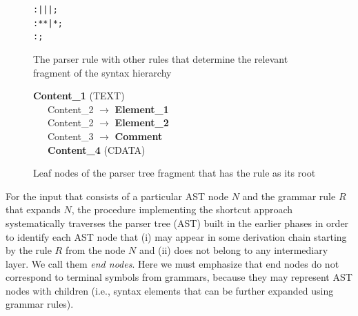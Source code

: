 \begin{figure}[ht]
\centering
\begin{framed}
\begin{alltt}
\small
   :  |  |  |  ;
   : \antlrliteral{<}  * \antlrliteral{>} * \antlrliteral{</}  \antlrliteral{>} | \antlrliteral{<}  * \antlrliteral{/>} ;
   : \antlrliteral{<!--}  \antlrliteral{-->} ;
\end{alltt}
\end{framed}
\caption{The parser rule  with other rules that determine the relevant fragment of the syntax hierarchy}
\label{fig:CONTENTHIERARCHY}
\end{figure}

\begin{figure}[ht]
\begin{framed}
\small
\textbf{Content{\_}1} (TEXT) \\
\ \ \ Content{\_}2 $\rightarrow$ \textbf{Element{\_}1} \\
\ \ \ Content{\_}2 $\rightarrow$ \textbf{Element{\_}2} \\
\ \ \ Content{\_}3 $\rightarrow$ \textbf{Comment} \\
\ \ \ \textbf{Content{\_}4} (CDATA)
\end{framed}
\caption{Leaf nodes of the parser tree fragment that has the  rule as its root}
\label{fig:CONTENTEXPAND}
\end{figure}

For the input that consists of a particular AST node $N$ and the grammar rule $R$ that expands $N$, the procedure implementing the shortcut approach systematically traverses the parser tree (AST) built in the earlier phases in order to identify each AST node that (i) may appear in some derivation chain starting by the rule $R$ from the node $N$ and (ii) does not belong to any intermediary layer.
We call them \emph{end nodes}.
Here we must emphasize that end nodes do not correspond to terminal symbols from grammars, because they may represent AST nodes with children (i.e., syntax elements that can be further expanded using grammar rules).

